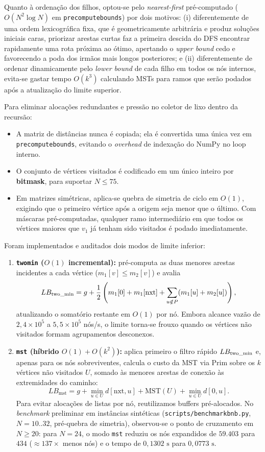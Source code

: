 \documentclass[12pt,a4paper]{article}
\renewcommand{\_}{\origunderscore\hspace{0pt}}
\begin{document}
Quanto à ordenação dos filhos, optou-se pelo \textit{nearest-first} pré-computado ($O(N^2 \log N)$ em \texttt{precompute\_bounds}) por dois motivos: (i) diferentemente de uma ordem lexicográfica fixa, que é geometricamente arbitrária e produz soluções iniciais caras, priorizar arestas curtas faz a primeira descida do DFS encontrar rapidamente uma rota próxima ao ótimo, apertando o \textit{upper bound} cedo e favorecendo a poda dos irmãos mais longos posteriores; e (ii) diferentemente de ordenar dinamicamente pelo \textit{lower bound} de cada filho em todos os nós internos, evita-se gastar tempo $O(k^3)$ calculando MSTs para ramos que serão podados após a atualização do limite superior.

Para eliminar alocações redundantes e pressão no coletor de lixo dentro da recursão:
\begin{itemize}
    \item A matriz de distâncias nunca é copiada; ela é convertida uma única vez em \texttt{precompute\_bounds}, evitando o \textit{overhead} de indexação do NumPy no loop interno.
    \item O conjunto de vértices visitados é codificado em um único inteiro por \textbf{bitmask}, para suportar $N \le 75$.
    \item Em matrizes simétricas, aplica-se quebra de simetria de ciclo em $O(1)$, exigindo que o primeiro vértice após a origem seja menor que o último. Com máscaras pré-computadas, qualquer ramo intermediário em que todos os vértices maiores que $v_1$ já tenham sido visitados é podado imediatamente.
\end{itemize}

Foram implementados e auditados dois modos de limite inferior:
\begin{enumerate}
    \item \textbf{\texttt{two\_min} ($O(1)$ incremental):} pré-computa as duas menores arestas incidentes a cada vértice ($m_1[v] \le m_2[v]$) e avalia
    \[
        LB_{\text{two\_min}} = g + \frac{1}{2}\left(m_1[0] + m_1[\text{nxt}] + \sum_{u \notin P} (m_1[u] + m_2[u])\right),
    \]
    atualizando o somatório restante em $O(1)$ por nó. Embora alcance vazão de $2{,}4 \times 10^5$ a $5{,}5 \times 10^5$ nós/s, o limite torna-se frouxo quando os vértices não visitados formam agrupamentos desconexos.
    \item \textbf{\texttt{mst} (híbrido $O(1) + O(k^2)$):} aplica primeiro o filtro rápido $LB_{\text{two\_min}}$ e, apenas para os nós sobreviventes, calcula o custo da MST via Prim sobre os $k$ vértices não visitados $U$, somado às menores arestas de conexão às extremidades do caminho:
    \[
        LB_{\text{mst}} = g + \min_{u \in U} d[\text{nxt}, u] + \text{MST}(U) + \min_{u \in U} d[0, u].
    \]
    Para evitar alocações de listas por nó, reutilizamos buffers pré-alocados. No \textit{benchmark} preliminar em instâncias sintéticas (\texttt{scripts/benchmark\_bnb.py}, $N=10..32$, pré-quebra de simetria), observou-se o ponto de cruzamento em $N \ge 20$: para $N=24$, o modo \texttt{mst} reduziu os nós expandidos de $59.403$ para $434$ ($\approx 137\times$ menos nós) e o tempo de $0{,}1302\text{ s}$ para $0{,}0773\text{ s}$.
\end{enumerate}
\end{document}
